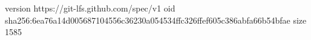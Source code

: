 version https://git-lfs.github.com/spec/v1
oid sha256:6ea76a14d005687104556c36230a054534ffc326ffef605c386abfa66b54bfae
size 1585
